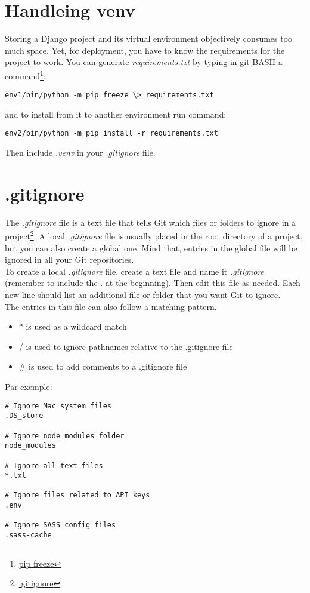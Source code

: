 \documentclass[12pt,a4paper]{article}
\begin{document}
\section{Handleing venv}
Storing a Django project and its virtual environment objectively consumes too much space. Yet, for deployment, you have to know the requirements for the project to work. You can generate \textit{requirements.txt} by typing in git BASH a command\footnote{\href{https://pip.pypa.io/en/stable/cli/pip_freeze/}{pip freeze}}:
\begin{verbatim}
env1/bin/python -m pip freeze \> requirements.txt
\end{verbatim}
and to install from it to another environment run command:
\begin{verbatim}
env2/bin/python -m pip install -r requirements.txt
\end{verbatim}

Then include \textit{.venv} in your \textit{.gitignore} file.


\section{.gitignore}
The \textit{.gitignore} file is a text file that tells Git which files or folders to ignore in a project\footnote{\href{https://www.freecodecamp.org/news/gitignore-what-is-it-and-how-to-add-to-repo/}{.gitignore}}. A local \textit{.gitignore} file is usually placed in the root directory of a project, but you can also create a global one. Mind that, entries in the global file will be ignored in all your Git repositories.\\
To create a local \textit{.gitignore} file, create a text file and name it \textit{.gitignore} (remember to include the . at the beginning). Then edit this file as needed. Each new line should list an additional file or folder that you want Git to ignore.\\

The entries in this file can also follow a matching pattern.
\begin{itemize}
	\item * is used as a wildcard match
	\item / is used to ignore pathnames relative to the .gitignore file
	\item \# is used to add comments to a .gitignore file 
\end{itemize}
Par exemple:
\begin{verbatim}
# Ignore Mac system files
.DS_store

# Ignore node_modules folder
node_modules

# Ignore all text files
*.txt

# Ignore files related to API keys
.env

# Ignore SASS config files
.sass-cache
\end{verbatim}
\end{document}
